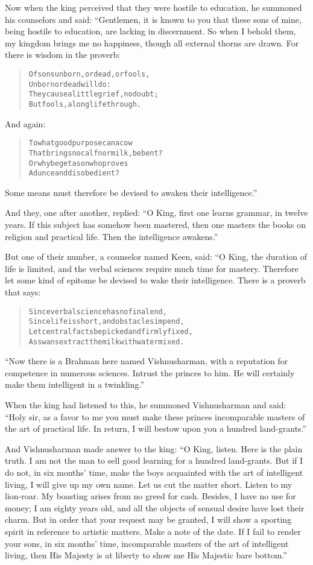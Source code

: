 \documentclass[article, twoside, 14pt]{memoir}
\renewenvironment{verbatim}{%
\begin{quote}%
\vskip -10pt%
\begin{alltt}\normalfont\large}{\end{alltt}%
\end{quote}%
\vskip -10pt
} %
\begin{document}
Now when the king perceived that they were hostile to education, he
summoned his counselors and said: “Gentlemen, it is known to you
that these sons of mine, being hostile to education, are lacking in
discernment. So when I behold them, my kingdom brings me no
happiness, though all external thorns are drawn. For there is
wisdom in the proverb:

\begin{verbatim}
Of sons unborn, or dead, or fools,
    Unborn or dead will do:
They cause a little grief, no doubt;
    But fools, a long life through.
\end{verbatim}
And again:

\begin{verbatim}
To what good purpose can a cow
    That brings no calf nor milk, be bent?
Or why beget a son who proves
    A dunce and disobedient?
\end{verbatim}
Some means must therefore be devised to awaken their
intelligence.”

And they, one after another, replied:
``O King, first one learns grammar, in twelve years. If this subject has somehow been mastered, then one masters the books on religion and practical life. Then the intelligence awakens.''

But one of their number, a counselor named Keen, said: “O King, the
duration of life is limited, and the verbal sciences require much
time for mastery. Therefore let some kind of epitome be devised to
wake their intelligence. There is a proverb that says:

\begin{verbatim}
Since verbal science has no final end,
Since life is short, and obstacles impend,
Let central facts be picked and firmly fixed,
As swans extract the milk with water mixed.
\end{verbatim}
``Now there is a Brahman here named Vishnusharman, with a reputation for competence in numerous sciences. Intrust the princes to him. He will certainly make them intelligent in a twinkling.''

When the king had listened to this, he summoned Vishnusharman and
said:
``Holy sir, as a favor to me you must make these princes incomparable masters of the art of practical life. In return, I will bestow upon you a hundred land-grants.''

And Vishnusharman made answer to the king:
``O King, listen. Here is the plain truth. I am not the man to sell good learning for a hundred land-grants. But if I do not, in six months' time, make the boys acquainted with the art of intelligent living, I will give up my own name. Let us cut the matter short. Listen to my lion-roar. My boasting arises from no greed for cash. Besides, I have no use for money; I am eighty years old, and all the objects of sensual desire have lost their charm. But in order that your request may be granted, I will show a sporting spirit in reference to artistic matters. Make a note of the date. If I fail to render your sons, in six months' time, incomparable masters of the art of intelligent living, then His Majesty is at liberty to show me His Majestic bare bottom.''
\end{document}
